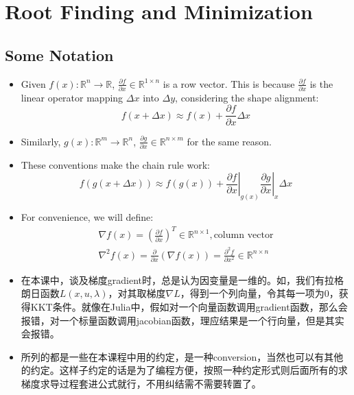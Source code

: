 \section{Root Finding and Minimization}

\subsection{Some Notation}
\begin{itemize}
    \item Given $f(x):\mathbb{R}^n\rightarrow\mathbb{R}$, $\frac{\partial f}{\partial x}\in\mathbb{R}^{1\times n}$ is a row vector. This is because $\frac{\partial f}{\partial x}$ is the linear operator mapping $\Delta x$ into $\Delta y$, considering the shape alignment:
    \begin{equation}
        f(x+\Delta x)\approx f(x)+\frac{\partial f}{\partial x}\Delta x
    \end{equation}
    \item Similarly, $g(x):\mathbb{R}^m\rightarrow\mathbb{R}^n$, $\frac{\partial g}{\partial x}\in\mathbb{R}^{n\times m}$ for the same reason.
    \item These conventions make the chain rule work:
    \begin{equation}
        f(g(x+\Delta x))\approx f(g(x))+\left.\frac{\partial f}{\partial x}\right|_{g(x)}\left.\frac{\partial g}{\partial x}\right|_x\Delta x
    \end{equation}
    \item For convenience, we will define:
    \begin{align}
        \nabla f(x)=\left(\frac{\partial f}{\partial x}\right)^T\in\mathbb{R}^{n\times1}, \text{column vector}\\
        \nabla^2 f(x)=\frac{\partial}{\partial x}\left(\nabla f(x)\right)=\frac{\partial^2 f}{\partial x^2}\in\mathbb{R}^{n\times n}
    \end{align}

    \item 在本课中，谈及梯度gradient时，总是认为因变量是一维的。如，我们有拉格朗日函数$L(x,u,\lambda)$，对其取梯度$\nabla L$，得到一个列向量，令其每一项为0，获得KKT条件。就像在Julia中，假如对一个向量函数调用gradient函数，那么会报错，对一个标量函数调用jacobian函数，理应结果是一个行向量，但是其实会报错。

    \item 所列的都是一些在本课程中用的约定，是一种conversion，当然也可以有其他的约定。这样子约定的话是为了编程方便，按照一种约定形式则后面所有的求梯度求导过程套进公式就行，不用纠结需不需要转置了。
\end{itemize}

